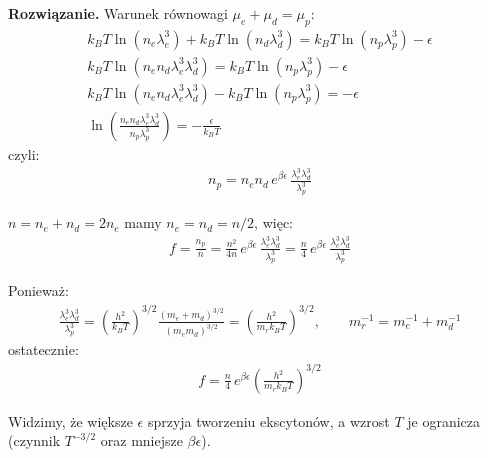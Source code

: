 \documentclass[11pt,a4paper]{article}
\newenvironment{solution}{\vspace{1cm} \par\textbf{Rozwiązanie.} \vspace{1cm}}{}
\begin{document}
\begin{solution}
Warunek równowagi $\mu_e+\mu_d=\mu_p$:
\begin{align*}
  k_B T\ln(n_e\lambda_e^3) + k_B T\ln(n_d\lambda_d^3)
  = k_B T\ln(n_p\lambda_p^3)-\epsilon \\
  k_B T\ln(n_e n_d \lambda_e^3 \lambda_d^3) = k_B T\ln(n_p\lambda_p^3)-\epsilon \\
  k_B T\ln(n_e n_d \lambda_e^3 \lambda_d^3) - k_B T\ln(n_p\lambda_p^3) = -\epsilon \\
  \ln\left(\frac{n_e n_d \lambda_e^3 \lambda_d^3}{n_p\lambda_p^3}\right) = -\frac{\epsilon}{k_BT} 
\end{align*}
czyli:
\begin{align*}
  n_p = n_e n_d\, e^{\beta\epsilon}\,\frac{\lambda_e^3\lambda_d^3}{\lambda_p^3}
\end{align*}

$n=n_e+n_d=2n_e$ mamy $n_e=n_d=n/2$, więc:
\begin{align*}
  f = \frac{n_p}{n}
  = \frac{n^{2}}{4n}\,e^{\beta\epsilon}\,\frac{\lambda_e^3\lambda_d^3}{\lambda_p^3}
  = \frac{n}{4}\,e^{\beta\epsilon}\,\frac{\lambda_e^3\lambda_d^3}{\lambda_p^3}
\end{align*}

Ponieważ:
\begin{align*}
  \frac{\lambda_e^3\lambda_d^3}{\lambda_p^3}
  = \left(\frac{h^2}{k_B T}\right)^{3/2}
    \frac{(m_e+m_d)^{3/2}}{(m_e m_d)^{3/2}}
  = \left(\frac{h^2}{m_r k_B T}\right)^{3/2},
  \qquad
  m_r^{-1}=m_e^{-1}+m_d^{-1}
\end{align*}
ostatecznie:
\begin{align*}
  f = \frac{n}{4}\,e^{\beta\epsilon}\left(\frac{h^2}{m_r k_B T}\right)^{3/2}
\end{align*}

Widzimy, że większe $\epsilon$ sprzyja tworzeniu ekscytonów, a wzrost $T$ je ogranicza
(czynnik $T^{-3/2}$ oraz mniejsze $\beta\epsilon$).


\newpage
\end{solution}
\end{document}
